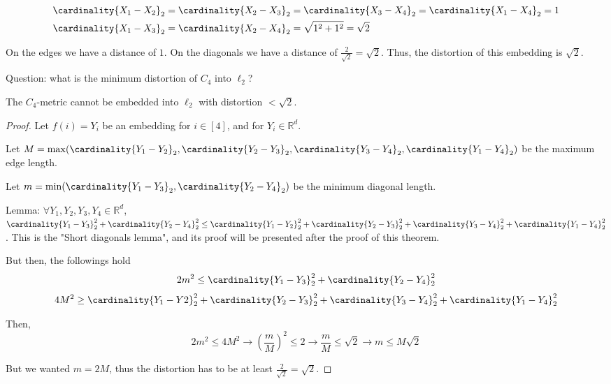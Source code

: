     \begin{equation*}
        \begin{split}
            &\cardinality{X_1 - X_2}_2 = \cardinality{X_2 - X_3}_2 = \cardinality{X_3 - X_4}_2 = \cardinality{X_1 - X_4}_2 = 1\\
            &\cardinality{X_1 - X_3}_2 = \cardinality{X_2 - X_4}_2 = \sqrt{1^2 + 1^2} = \sqrt{2}
        \end{split}
    \end{equation*}

    On the edges we have a distance of $1$. On the diagonals we have a distance of $\frac{2}{\sqrt{2}} = \sqrt{2}$.
    Thus, the distortion of this embedding is $\sqrt{2}$.

    Question: what is the minimum distortion of $C_4$ into $\ell_2$?

    \begin{theorem}
        The $C_4$-metric cannot be embedded into $\ell_2$ with distortion $< \sqrt{2}$.
    \end{theorem}

    \begin{proof}
        Let $f(i) = Y_i$ be an embedding for $i \in [4]$, and for $Y_i \in \mathbb{R}^d$.

        Let $M = \max (\cardinality{Y_1 - Y_2}_2, \cardinality{Y_2 - Y_3}_2, \cardinality{Y_3 - Y_4}_2, \cardinality{Y_1 - Y_4}_2)$ be the maximum edge length.

        Let $m = \min (\cardinality{Y_1 - Y_3}_2, \cardinality{Y_2 - Y_4}_2)$ be the minimum diagonal length.

        Lemma: $\forall Y_1, Y_2, Y_3, Y_4 \in \mathbb{R}^d$, $\cardinality{Y_1 - Y_3}_2^2 + \cardinality{Y_2 - Y_4}_2^2 \leq \cardinality{Y_1 - Y_2}_2^2 + \cardinality{Y_2 - Y_3}_2^2 + \cardinality{Y_3 - Y_4}_2^2 + \cardinality{Y_1 - Y_4}_2^2$.
        This is the "Short diagonals lemma", and its proof will be presented after the proof of this theorem.

        But then, the followings hold
        \[ 2m^2 \leq \cardinality{Y_1 - Y_3}_2^2 + \cardinality{Y_2 - Y_4}_2^2 \]
        \[ 4M^2 \geq \cardinality{Y_1 - Y2}_2^2 + \cardinality{Y_2 - Y_3}_2^2 + \cardinality{Y_3 - Y_4}_2^2 + \cardinality{Y_1 - Y_4}_2^2 \]

        Then,
        \[ 2m^2 \leq 4M^2 \rightarrow (\frac{m}{M})^2 \leq 2 \rightarrow \frac{m}{M} \leq \sqrt{2} \rightarrow m \leq M \sqrt{2} \]

        But we wanted $m = 2M$, thus the distortion has to be at least $\frac{2}{\sqrt{2}} = \sqrt{2}$.
    \end{proof}

